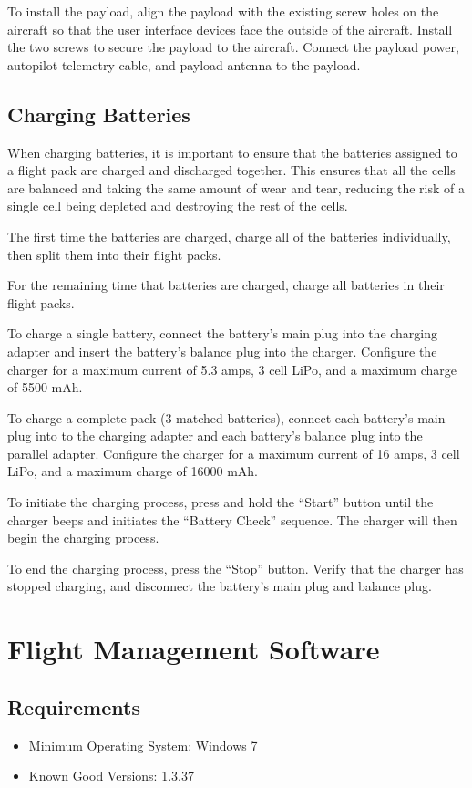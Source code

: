 \documentclass{report}
\begin{document}
		To install the payload, align the payload with the existing screw holes on the aircraft so that the user interface devices face the outside of the aircraft.  Install the two screws to secure the payload to the aircraft.  Connect the payload power, autopilot telemetry cable, and payload antenna to the payload.
	\section{Charging Batteries}
		When charging batteries, it is important to ensure that the batteries assigned to a flight pack are charged and discharged together.  This ensures that all the cells are balanced and taking the same amount of wear and tear, reducing the risk of a single cell being depleted and destroying the rest of the cells.

		The first time the batteries are charged, charge all of the batteries individually, then split them into their flight packs.

		For the remaining time that batteries are charged, charge all batteries in their flight packs.

		To charge a single battery, connect the battery's main plug into the charging adapter and insert the battery's balance plug into the charger.  Configure the charger for a maximum current of 5.3 amps, 3 cell LiPo, and a maximum charge of 5500 mAh.

		To charge a complete pack (3 matched batteries), connect each battery's main plug into to the charging adapter and each battery's balance plug into the parallel adapter.  Configure the charger for a maximum current of 16 amps, 3 cell LiPo, and a maximum charge of 16000 mAh.

		To initiate the charging process, press and hold the ``Start'' button until the charger beeps and initiates the ``Battery Check'' sequence.  The charger will then begin the charging process.

		To end the charging process, press the ``Stop'' button.  Verify that the charger has stopped charging, and disconnect the battery's main plug and balance plug.
\chapter{Flight Management Software}
	\section{Requirements}
		\begin{itemize}
			\item Minimum Operating System: Windows 7
			\item Known Good Versions: 1.3.37
		\end{itemize}
\end{document}
